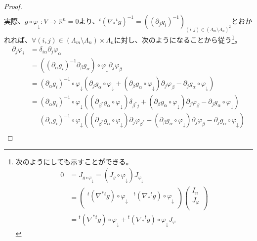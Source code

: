 \documentclass[dvipdfmx]{jsarticle}
\begin{document}
\begin{proof}
\begin{align*}
\end{align*}
実際、$g \circ \varphi_{\downarrow}:V \rightarrow \mathbb{R}^{n} = 0$より、${}^t \left( \nabla_{*}{}^t g \right)^{- 1} = \left( \left( \partial_{j}g_{i} \right)^{- 1} \right)_{(i,j) \in \left( \varLambda_{m} \setminus \varLambda_{n} \right)^{2}}$とおかれれば、$\forall(i,j) \in \left( \varLambda_{m} \setminus \varLambda_{n} \right) \times \varLambda_{n}$に対し、次のようになることから従う\footnote{次のようにしても示すことができる。
\begin{align*}
0 &= J_{g \circ \varphi_{\downarrow}} = \left( J_{g} \circ \varphi_{\downarrow} \right)J_{\varphi_{\downarrow}} \\
&= \begin{pmatrix}
  {}^t \left( \nabla^{*}{}^t g \right) \circ \varphi_{\downarrow} &{}^{t}\left( \nabla_{*}{}^{t}g \right) \circ \varphi_{\downarrow} \\
\end{pmatrix}\begin{pmatrix}
  I_{n} \\
  J_{\varphi} \\
\end{pmatrix}\\ 
&={}^t \left( \nabla^{*}{}^t g \right) \circ \varphi_{\downarrow} +{}^t \left( \nabla_{*}{}^{t}g \right) \circ \varphi_{\downarrow}J_{\varphi}
\end{align*}}。
\begin{align*}
\partial_{j}\varphi_{i} &= \delta_{i\alpha}\partial_{j}\varphi_{\alpha}\\
&= \left( \left( \partial_{\alpha}g_{i} \right)^{- 1}\partial_{\beta}g_{\alpha} \right) \circ \varphi_{\downarrow}\partial_{j}\varphi_{\beta}\\
&= \left( \partial_{\alpha}g_{i} \right)^{- 1} \circ \varphi_{\downarrow}\left( \partial_{j}g_{\alpha} \circ \varphi_{\downarrow} + \left( \partial_{\beta}g_{\alpha} \circ \varphi_{\downarrow} \right)\partial_{j}\varphi_{\beta} - \partial_{j}g_{\alpha} \circ \varphi_{\downarrow} \right)\\
&= \left( \partial_{\alpha}g_{i} \right)^{- 1} \circ \varphi_{\downarrow}\left( \left( \partial_{\beta^{*}}g_{\alpha} \circ \varphi_{\downarrow} \right)\delta_{\beta^{*}j} + \left( \partial_{\beta}g_{\alpha} \circ \varphi_{\downarrow} \right)\partial_{j}\varphi_{\beta} - \partial_{j}g_{\alpha} \circ \varphi_{\downarrow} \right)\\
&= \left( \partial_{\alpha}g_{i} \right)^{- 1} \circ \varphi_{\downarrow}\left( \left( \partial_{\beta^{*}}g_{\alpha} \circ \varphi_{\downarrow} \right)\partial_{j}\varphi_{\beta^{*}} + \left( \partial_{\beta}g_{\alpha} \circ \varphi_{\downarrow} \right)\partial_{j}\varphi_{\beta} - \partial_{j}g_{\alpha} \circ \varphi_{\downarrow} \right)\\

\end{align*}
\end{proof}
\end{document}
